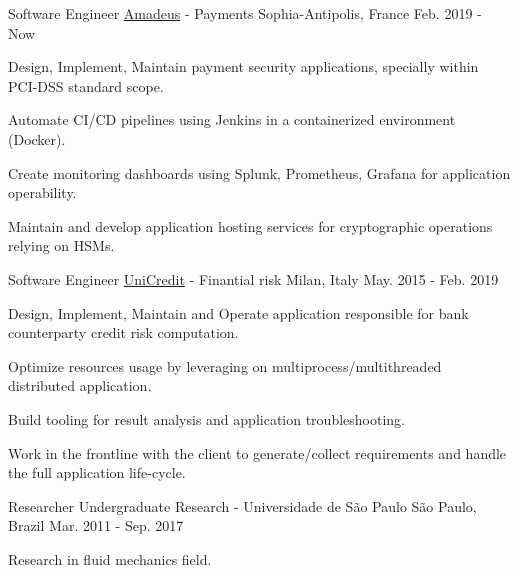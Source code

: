 

\begin{cventries}

  \cventry
    {Software Engineer} %
    {\href{https://amadeus.com/}{Amadeus} - Payments} %
    {Sophia-Antipolis, France} %
    {Feb. 2019 - Now} %
    {
      \begin{cvitems} %
        \item {Design, Implement, Maintain payment security applications, specially within PCI-DSS standard scope.}
        \item {Automate CI/CD pipelines using Jenkins in a containerized environment (Docker).}
        \item {Create monitoring dashboards using Splunk, Prometheus, Grafana for application operability.}
        \item {Maintain and develop application hosting services for cryptographic operations relying on HSMs.}
      \end{cvitems}
    }

  \cventry
    {Software Engineer} %
    {\href{https://unicreditgroup.com/}{UniCredit} - Finantial risk} %
    {Milan, Italy} %
    {May. 2015 - Feb. 2019} %
    {
      \begin{cvitems} %
        \item {Design, Implement, Maintain and Operate application responsible for bank counterparty credit risk computation.}
        \item {Optimize resources usage by leveraging on multiprocess/multithreaded distributed application.}
        \item {Build tooling for result analysis and application troubleshooting.}
        \item {Work in the frontline with the client to generate/collect requirements and handle the full application life-cycle.}
      \end{cvitems}
    }

  \cventry
    {Researcher} %
    {Undergraduate Research - Universidade de São Paulo} %
    {São Paulo, Brazil} %
    {Mar. 2011 - Sep. 2017} %
    {
      \begin{cvitems} %
        \item {Research in fluid mechanics field.}
      \end{cvitems}
    }
\end{cventries}
